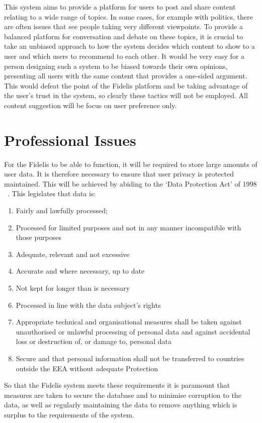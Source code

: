 This system aims to provide a platform for users to post and share content relating to a wide range of topics. In some cases, for example with politics, there are often issues that see people taking very different viewpoints. To provide a balanced platform for conversation and debate on these topics, it is crucial to take an unbiased approach to how the system decides which content to show to a user and which users to recommend to each other. It would be very easy for a person designing such a system to be biased towards their own opinions, presenting all users with the same content that provides a one-sided argument. This would defeat the point of the Fidelis platform and be taking advantage of the user’s trust in the system, so clearly these tactics will not be employed. All content suggestion will be focus on user preference only.

\section{Professional Issues}
For the Fidelis to be able to function, it will be required to store large amounts of user data. It is therefore necessary to ensure that user privacy is protected maintained. This will be achieved by abiding to the `Data Protection Act' of 1998 ~\cite{DPA}. This legislates that data is:

\begin{enumerate}
\item Fairly and lawfully processed; 
\item Processed for limited purposes and not in any manner incompatible with those purposes
\item Adequate, relevant and not excessive
\item Accurate and where necessary, up to date
\item Not kept for longer than is necessary
\item Processed in line with the data subject's rights 
\item Appropriate technical and organisational measures shall be taken against unauthorised or unlawful processing of personal data and against accidental loss or destruction of, or damage to, personal data
\item Secure and that personal information shall not be transferred to countries outside the EEA without adequate Protection
\end{enumerate}

So that the Fidelis system meets these requirements it is paramount that measures are taken to secure the database and to minimise corruption to the data, as well as regularly maintaining the data to remove anything which is surplus to the requirements of the system.